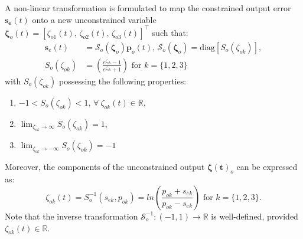\documentclass[lettersize,journal]{IEEEtran}
\begin{document}
A non-linear transformation is formulated to map the constrained output error $\boldsymbol{s_e}(t)$ onto a new unconstrained variable $\boldsymbol{\zeta}_o(t) = [\zeta_{o1}(t),\, \zeta_{o2}(t),\, \zeta_{o3}(t)]^{\top}$ such that:
\begin{align}
    \label{error transformation for outer loop: equation}
    \boldsymbol{s}_{e}(t) &= \mathcal{S}_o(\boldsymbol{\zeta}_o) \boldsymbol{p}_o(t), \, \mathcal{S}_o(\boldsymbol{\zeta}_o) = \text{diag}[S_o(\zeta_{ok})], \nonumber \\
    S_o(\zeta_{ok}) &= \left(\frac{e^{\zeta_{ok}} - 1}{e^{\zeta_{ok}} + 1} \right) \text{ for } k = \{1, 2, 3\}
\end{align}
with $S_o(\zeta_{ok})$ possessing the following properties:
\begin{enumerate}
    \item[I.] $ -1 < S_o(\zeta_{ok}) < 1 $, $\forall~\zeta_{ok}(t) \in \mathbb{R},$ 
    \item[II.] $\lim_{\zeta_{ok} \to \infty} S_o(\zeta_{ok}) = 1$,
    \item[III.] $\lim_{\zeta_{ok} \to -\infty} S_o(\zeta_{ok}) = -1$
\end{enumerate}

Moreover, the components of the unconstrained output $\boldsymbol{\zeta(t)}_o$ can be expressed as:
\begin{equation} \label{inverse transformation function for outer loop}
    \zeta_{ok}(t) = S_o^{-1}(s_{e k}, p_{ok}) = ln \left(\frac{p_{ok} + s_{e k}}{p_{ok} - s_{e k}} \right) \text{ for } k = \{1, 2, 3\}.
\end{equation}
Note that the inverse transformation $\mathcal{S}_o^{-1}: (-1, 1) \to \mathbb{R}$ is well-defined, provided $\zeta_{ok}(t) \in \mathbb{R}$.
\end{document}
